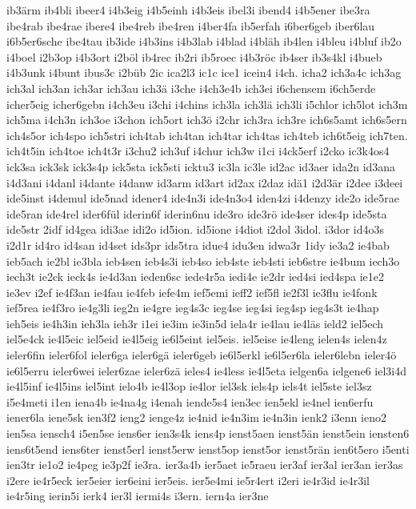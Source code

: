 {ib3ärm
ib4bli
ibeer4
i4b3eig
i4b5einh
i4b3eis
ibel3i
ibend4
i4b5ener
ibe3ra
ibe4rab
ibe4rae
ibere4
ibe4reb
ibe4ren
i4ber4fa
ib5erfah
i6ber6geb
iber6lau
i6b5er6sche
ibe4tau
ib3ide
i4b3ins
i4b3lab
i4blad
i4bläh
ib4len
i4bleu
i4bluf
ib2o
i4boel
i2b3op
i4b3ort
i2böl
ib4rec
ib2ri
ib5roec
i4b3röc
ib4ser
ib3s4kl
i4bueb
i4b3unk
i4bunt
ibus3c
i2büb
2ic
ica2l3
ic1c
ice1
icein4
i4ch.
icha2
ich3a4c
ich3ag
ich3al
ich3an
ich3ar
ich3au
ich3ä
i3che
i4ch3e4b
ich3ei
i6chensem
i6ch5erde
icher5eig
icher6gebn
i4ch3eu
i3chi
i4chins
ich3la
ich3lä
ich3li
i5chlor
ich5lot
ich3m
ich5ma
i4ch3n
ich3oe
i3chon
ich5ort
ich3ö
i2chr
ich3ra
ich3re
ich6s5amt
ich6s5ern
ich4s5or
ich4spo
ich5stri
ich4tab
ich4tan
ich4tar
ich4tas
ich4teb
ich6t5eig
ich7ten.
ich4t5in
ich4toe
ich4t3r
i3chu2
ich3uf
i4chur
ich3w
i1ci
i4ck5erf
i2cko
ic3k4os4
ick3sa
ick3sk
ick3s4p
ick5sta
ick5sti
icktu3
ic3la
ic3le
id2ac
id3aer
ida2n
id3ana
i4d3ani
i4danl
i4dante
i4danw
id3arm
id3art
id2ax
i2daz
idä1
i2d3är
i2dee
i3deei
ide5inst
i4demul
ide5nad
idener4
ide4n3i
ide4n3o4
iden4zi
i4denzy
ide2o
ide5rae
ide5ran
ide4rel
ider6fül
iderin6f
iderin6nu
ide3ro
ide3rö
ide4ser
ides4p
ide5sta
ide5str
2idf
id4gea
idi3ae
idi2o
id5ion.
id5ione
i4diot
i2dol
3idol.
i3dor
id4o3s
i2d1r
id4ro
id4san
id4set
ids3pr
ids5tra
idue4
idu3en
idwa3r
1idy
ie3a2
ie4bab
ieb5ach
ie2bl
ie3bla
ieb4sen
ieb4s3i
ieb4so
ieb4ste
ieb4sti
ieb6stre
ie4bum
iech3o
iech3t
ie2ck
ieck4s
ie4d3an
ieden6sc
iede4r5a
iedi4e
ie2dr
ied4si
ied4spa
ie1e2
ie3ev
i2ef
ie4f3an
ie4fau
ie4feb
iefe4m
ief5emi
ieff2
ief5fl
ie2f3l
ie3flu
ie4fonk
ief5rea
ie4f3ro
ie4g3li
ieg2n
ie4gre
ieg4s3c
ieg4se
ieg4si
ieg4sp
ieg4s3t
ie4hap
ieh5eis
ie4h3in
ieh3la
ieh3r
i1ei
ie3im
ie3in5d
iela4r
ie4lau
ie4läs
ield2
iel5ech
iel5e4ck
ie4l5eic
iel5eid
ie4l5eig
ie6l5eint
iel5eis.
iel5eise
ie4leng
ielen4s
ielen4z
ieler6fin
ieler6fol
ieler6ga
ieler6gä
ieler6geb
ie6l5erkl
ie6l5er6la
ieler6lebn
ieler4ö
ie6l5erru
ieler6wei
ieler6zae
ieler6zä
ieles4
ie4less
ie4l5eta
ielgen6a
ielgene6
iel3i4d
ie4l5inf
ie4l5ins
iel5int
ielo4b
ie4l3op
ie4lor
iel3sk
iels4p
iels4t
iel5ste
iel3sz
i5e4meti
i1en
iena4b
ie4na4g
i4enah
iende5s4
ien3ec
ien5ekl
ie4nel
ien6erfu
iener6la
iene5sk
ien3f2
ieng2
ienge4z
ie4nid
ie4n3im
ie4n3in
ienk2
i3enn
ieno2
ien5sa
iensch4
i5en5se
iens6er
ien3s4k
iens4p
ienst5aen
ienst5än
ienst5ein
iensten6
iens6t5end
iens6ter
ienst5erl
ienst5erw
ienst5op
ienst5or
ienst5rän
ien6t5ero
i5enti
ien3tr
ie1o2
ie4peg
ie3p2f
ie3ra.
ier3a4b
ier5aet
ie5raeu
ier3af
ier3al
ier3an
ier3as
i2ere
ie4r5eck
ier5eier
ier6eini
ier5eis.
ier5e4mi
ie5r4ert
i2eri
ie4r3id
ie4r3il
ie4r5ing
ierin5i
ierk4
ier3l
iermi4s
i3ern.
iern4a
ier3ne
}
